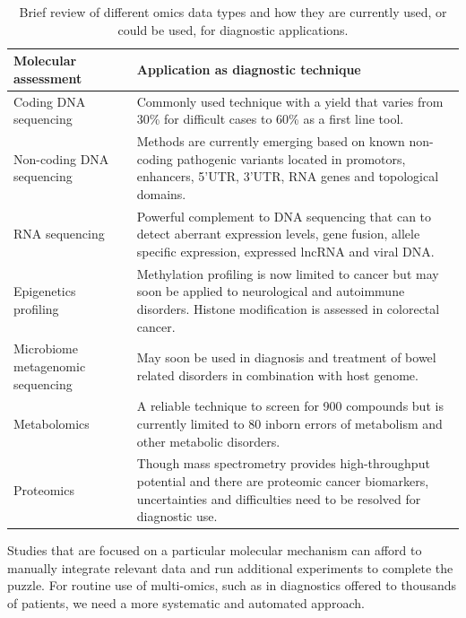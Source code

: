 \begin{table}
\begin{tabulary}{\linewidth}{LL}
  Molecular assessment & Application as diagnostic technique \\
  \hline
  \rule{0pt}{2.5ex}Coding DNA sequencing & Commonly used technique with a yield that varies from 30\% for difficult cases\cite{van_Diemen_2017} to 60\% as a first line tool\cite{Miller_2015}. \\
  \rule{0pt}{2.5ex}Non-coding DNA sequencing & Methods are currently emerging\cite{Smedley_2016,Gussow_2017} based on known non-coding pathogenic variants located in promotors, enhancers, 5'UTR, 3'UTR, RNA genes and topological domains\cite{Dixon_2012}. \\
  \rule{0pt}{2.5ex}RNA sequencing & Powerful complement to DNA sequencing that can to detect aberrant expression levels, gene fusion, allele specific expression, expressed lncRNA and viral DNA\cite{Deelen_2015,Byron_2016,Soemedi_2017,Kremer_2017,Cummings_2017}. \\
  \rule{0pt}{2.5ex}Epigenetics profiling & Methylation profiling is now limited to cancer but may soon be applied to neurological and autoimmune disorders\cite{Heyn_2012}. Histone modification is assessed in colorectal cancer\cite{Gargalionis_2012}. \\
  \rule{0pt}{2.5ex}Microbiome metagenomic sequencing & May soon be used in diagnosis and treatment of bowel related disorders\cite{Raes_2016} in combination with host genome\cite{Bonder_2016}. \\
  \rule{0pt}{2.5ex}Metabolomics & A reliable technique\cite{Heiner_Fokkema_2016} to screen for 900 compounds\cite{Miller_2015b} but is currently limited to 80 inborn errors of metabolism and other metabolic disorders\cite{Gowda_2008}. \\
  \rule{0pt}{2.5ex}Proteomics & Though mass spectrometry provides high-throughput potential\cite{Hanash_2003} and there are proteomic cancer biomarkers\cite{F_z_ry_2013}, uncertainties and difficulties need to be resolved for diagnostic use\cite{Gstaiger_2009}. \\
  \hline
\end{tabulary}
\caption[Brief review of omics data types]{Brief review of different omics data types and how they are currently used, or could be used, for diagnostic applications.}
\label{table:omicsfordiag}
\end{table}

Studies that are focused on a particular molecular mechanism can afford to manually integrate relevant data and run additional experiments to complete the puzzle\cite{Peters_2017}.
For routine use of multi-omics, such as in diagnostics offered to thousands of patients, we need a more systematic and automated approach.

